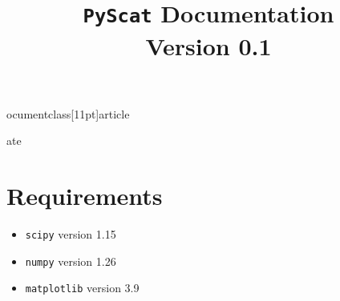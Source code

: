 ocumentclass[11pt]{article}
\usepackage[utf8]{inputenc}
\usepackage{amsmath}
\usepackage{mathtools}
\usepackage{hyperref}
\usepackage{geometry}
\usepackage{graphicx}
\usepackage{enumitem}
\usepackage{amsfonts}
\usepackage{amssymb}
\usepackage{verbatim}
\usepackage{mathrsfs}
\usepackage{physics}
\usepackage{stix}
\geometry{margin=1in}
\usepackage{csquotes}
\usepackage[backend=biber,style=ieee,sortcites,eprint=true,maxnames=5,defernumbers=true,refsegment=section]{biblatex}

\title{\texttt{PyScat} Documentation \\ \large Version 0.1}
\author{}
ate{}



\maketitle
\tableofcontents
\newpage

\section{Requirements}
\begin{itemize}
    \item \texttt{scipy} version 1.15
    \item \texttt{numpy} version 1.26
    \item \texttt{matplotlib} version 3.9
\end{itemize}

\newpage



\newpage


\newpage

\newpage

\newpage

\newpage

\newpage

\newpage
\medskip
\printbibliography



